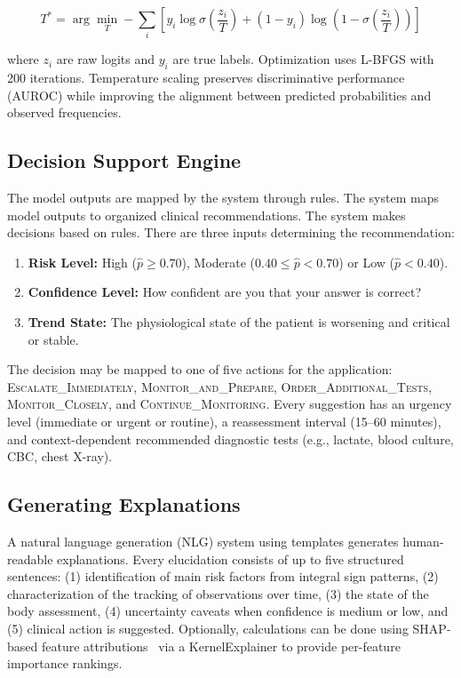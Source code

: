 \documentclass[conference]{IEEEtran}
\begin{document}
\begin{equation}
T^* = \arg\min_T -\sum_{i} \left[ y_i \log \sigma\!\left(\frac{z_i}{T}\right) + (1 - y_i) \log\!\left(1 - \sigma\!\left(\frac{z_i}{T}\right)\right) \right]
\end{equation}

where $z_i$ are raw logits and $y_i$ are true labels. Optimization uses L-BFGS with 200 iterations. Temperature scaling preserves discriminative performance (AUROC) while improving the alignment between predicted probabilities and observed frequencies.

\subsection{Decision Support Engine}

The model outputs are mapped by the system through rules. The system maps model outputs to organized clinical recommendations. The system makes decisions based on rules. There are three inputs determining the recommendation:

\begin{enumerate}
    \item \textbf{Risk Level:} High ($\hat{p} \geq 0.70$), Moderate ($0.40 \leq \hat{p} < 0.70$) or Low ($\hat{p} < 0.40$).
    \item \textbf{Confidence Level:} How confident are you that your answer is correct?
    \item \textbf{Trend State:} The physiological state of the patient is worsening and critical or stable.
\end{enumerate}

The decision may be mapped to one of five actions for the application: \textsc{Escalate\_Immediately}, \textsc{Monitor\_and\_Prepare}, \textsc{Order\_Additional\_Tests}, \textsc{Monitor\_Closely}, and \textsc{Continue\_Monitoring}. Every suggestion has an urgency level (immediate or urgent or routine), a reassessment interval (15--60 minutes), and context-dependent recommended diagnostic tests (e.g., lactate, blood culture, CBC, chest X-ray).

\subsection{Generating Explanations}

A natural language generation (NLG) system using templates generates human-readable explanations. Every elucidation consists of up to five structured sentences: (1) identification of main risk factors from integral sign patterns, (2) characterization of the tracking of observations over time, (3) the state of the body assessment, (4) uncertainty caveats when confidence is medium or low, and (5) clinical action is suggested. Optionally, calculations can be done using SHAP-based feature attributions~\cite{Lundberg2017} via a KernelExplainer to provide per-feature importance rankings.
\end{document}
